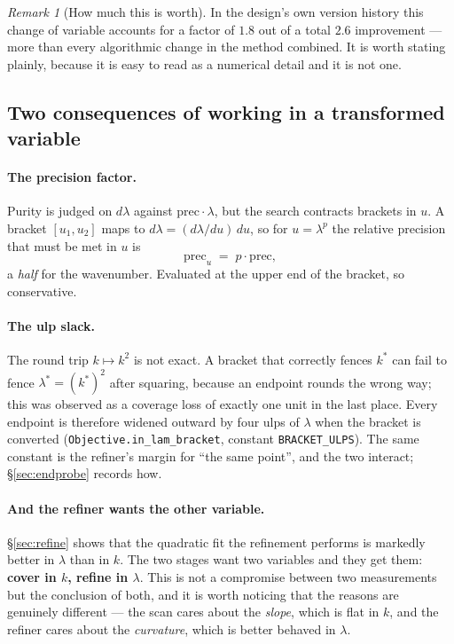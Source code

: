 \documentclass[11pt]{article}
\theoremstyle{definition}
\theoremstyle{remark}
\newtheorem{remark}{Remark}
\newcommand{\code}[1]{\texttt{#1}}
\newcommand{\lam}{\lambda}
\newcommand{\pr}{\mathrm{prec}}
\begin{document}
\begin{remark}[How much this is worth]
In the design's own version history this change of variable accounts for a factor of $1.8$ out
of a total $2.6$ improvement --- more than every algorithmic change in the method combined. It
is worth stating plainly, because it is easy to read as a numerical detail and it is not one.
\end{remark}

\subsection{Two consequences of working in a transformed variable}

\paragraph{The precision factor.} Purity is judged on $d\lam$ against $\pr\cdot\lam$, but the
search contracts brackets in $u$. A bracket $[u_1,u_2]$ maps to $d\lam=(d\lam/du)\,du$, so for
$u=\lam^p$ the relative precision that must be met in $u$ is
\begin{equation}\label{eq:precu}
  \pr_u \;=\; p\cdot\pr,
\end{equation}
a \emph{half} for the wavenumber. Evaluated at the upper end of the bracket, so conservative.

\paragraph{The ulp slack.} The round trip $k\mapsto k^2$ is not exact. A bracket that correctly
fences $k^*$ can fail to fence $\lam^*=(k^*)^2$ after squaring, because an endpoint rounds the
wrong way; this was observed as a coverage loss of exactly one unit in the last place. Every
endpoint is therefore widened outward by four ulps of $\lam$ when the bracket is converted
(\code{Objective.in\_lam\_bracket}, constant \code{BRACKET\_ULPS}). The same constant is the
refiner's margin for ``the same point'', and the two interact; \S\ref{sec:endprobe} records how.

\paragraph{And the refiner wants the other variable.} \S\ref{sec:refine} shows that the
quadratic fit the refinement performs is markedly better in $\lam$ than in $k$. The two stages
want two variables and they get them: \textbf{cover in $k$, refine in $\lam$}. This is not a
compromise between two measurements but the conclusion of both, and it is worth noticing that
the reasons are genuinely different --- the scan cares about the \emph{slope}, which is flat in
$k$, and the refiner cares about the \emph{curvature}, which is better behaved in $\lam$.
\end{document}
